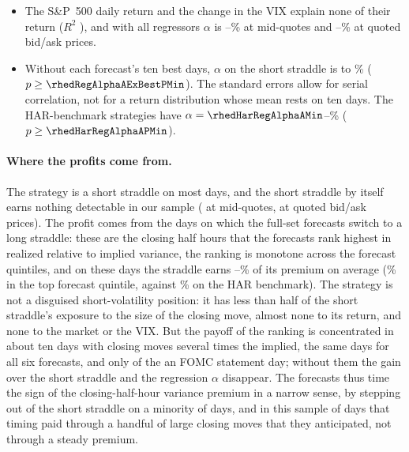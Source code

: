 \begin{itemize}
\begin{itemize}
    closing half hour changes their return by \rhedRegBetaAbsMin{} to \rhedRegBetaAbsMax\% of the premium ($t$ from
    \rhedRegBetaAbsTMin{} to \rhedRegBetaAbsTMax); for their mean return the coefficient, \rhedRegAvgBetaAbs\%, is
    \rhedRegAbsRatio\% of the short straddle's \rhedRegShortBetaAbs\%. The sign of the move does not matter
    (coefficients \rhedRegBetaMoveMin{} to \rhedRegBetaMoveMax).
  \item The S\&P~500 daily return and the change in the VIX explain none of their return ($R^2$
    \rhedRegRsqCMax), and with all regressors $\alpha$ is \rhedRegAlphaDMin--\rhedRegAlphaDMax\% at mid-quotes and
    \rhedRegAlphaDXMin--\rhedRegAlphaDXMax\% at quoted bid/ask prices.
  \item Without each forecast's ten best days, $\alpha$ on the short straddle is \rhedRegAlphaAExBestMin{} to
    \rhedRegAlphaAExBestMax\% ($p \ge \rhedRegAlphaAExBestPMin$). The standard errors allow for serial correlation, not
    for a return distribution whose mean rests on ten days. The HAR-benchmark strategies have
    $\alpha = \rhedHarRegAlphaAMin$--\rhedHarRegAlphaAMax\% ($p \ge \rhedHarRegAlphaAPMin$).
  \end{itemize}
\end{itemize}

\paragraph{Where the profits come from.} The strategy is a short straddle on most days, and the short straddle
by itself earns nothing detectable in our sample (\rheShortSh{} at mid-quotes, \rheShortShX{} at quoted bid/ask
prices). The profit comes from the days on which the full-set forecasts switch to a long straddle: these are the
closing half hours that the forecasts rank highest in realized relative to implied variance, the ranking is monotone
across the forecast quintiles, and on these days the straddle earns \rhedLongMidMin--\rhedLongMidMax\% of its premium
on average (\rhedQFiveR\% in the top forecast quintile, against \rhedHarQFiveR\% on the HAR benchmark). The strategy is not a disguised short-volatility
position: it has less than half of the short straddle's exposure to the size of the closing move, almost none to its
return, and none to the market or the VIX. But the payoff of the ranking is concentrated in about ten days with closing
moves several times the implied, the same days for all six forecasts, and only \rhedBestFomcN{} of the \rhedBestUnion{} an FOMC
statement day;
without them the gain over the short straddle and the regression $\alpha$ disappear. The forecasts thus time the sign
of the closing-half-hour variance premium in a narrow sense, by stepping out of the short straddle on a minority of
days, and in this sample of \rheSzDays{} days that timing paid through a handful of large closing moves that they
anticipated, not through a steady premium.
